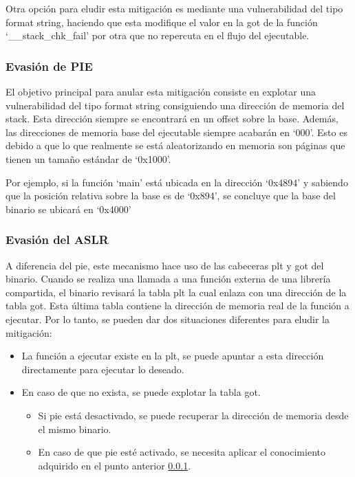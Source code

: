 Otra opción para eludir esta mitigación es mediante una vulnerabilidad del tipo format string, haciendo que esta modifique el valor en la \acrfull{got} de la función `\_\_stack\_chk\_fail' por otra que no repercuta en el flujo del ejecutable.
\subsubsection{Evasión de PIE} \label{subsub:pie}
El objetivo principal para anular esta mitigación consiste en explotar una vulnerabilidad del tipo format string consiguiendo una dirección de memoria del stack.
Esta dirección siempre se encontrará en un offset sobre la base.
Además, las direcciones de memoria base del ejecutable siempre acabarán en `000'.
Esto es debido a que lo que realmente se está aleatorizando en memoria son páginas que tienen un tamaño estándar de `0x1000'.

Por ejemplo, si la función `main' está ubicada en la dirección `0x4894' y sabiendo que la posición relativa sobre la base es de `0x894', se concluye que la base del binario se ubicará en `0x4000'
\subsubsection{Evasión del ASLR}
A diferencia del \acrshort{pie}, este mecanismo hace uso de las cabeceras \acrfull{plt} y \acrfull{got} del binario.
Cuando se realiza una llamada a una función externa de una librería compartida, el binario revisará la tabla \acrshort{plt} la cual enlaza con una dirección de la tabla \acrshort{got}.
Esta última tabla contiene la dirección de memoria real de la función a ejecutar.
Por lo tanto, se pueden dar dos situaciones diferentes para eludir la mitigación:
\begin{itemize}
    \item La función a ejecutar existe en la \acrshort{plt}, se puede apuntar a esta dirección directamente para ejecutar lo deseado.
    \item En caso de que no exista, se puede explotar la tabla \acrshort{got}.
    \begin{itemize}
        \item Si \acrshort{pie} está desactivado, se puede recuperar la dirección de memoria desde el mismo binario.
        \item En caso de que \acrshort{pie} esté activado, se necesita aplicar el conocimiento adquirido en el punto anterior \ref{subsub:pie}.
    \end{itemize}
\end{itemize}

